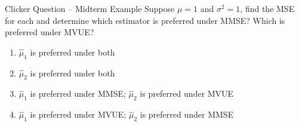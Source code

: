 \documentclass{beamer}
\begin{document}

\begin{frame}{Clicker Question -- Midterm Example}
	Suppose $\mu=1$ and $\sigma^2=1$, find the MSE for each and determine which estimator is preferred under MMSE? Which is preferred under MVUE? 
	\begin{enumerate}[label=(\alph*)]
		\item $\hat{\mu}_1$ is preferred under both
		\item $\hat{\mu}_2$ is preferred under both
		\item $\hat{\mu}_1$ is preferred under MMSE; $\hat{\mu}_2$ is preferred under MVUE %
		\item $\hat{\mu}_1$ is preferred under MVUE; $\hat{\mu}_2$ is preferred under MMSE
	\end{enumerate}
\end{frame}
\end{document}
